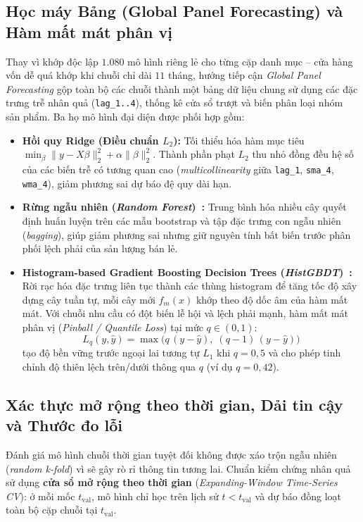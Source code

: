 \subsection{Học máy Bảng (Global Panel Forecasting) và Hàm mất mát phân vị}
Thay vì khớp độc lập $1.080$ mô hình riêng lẻ cho từng cặp danh mục -- cửa hàng vốn dễ quá khớp khi chuỗi chỉ dài $11$ tháng, hướng tiếp cận \textit{Global Panel Forecasting} gộp toàn bộ các chuỗi thành một bảng dữ liệu chung sử dụng các đặc trưng trễ nhân quả (\texttt{lag_1..4}), thống kê cửa sổ trượt và biến phân loại nhóm sản phẩm. Ba họ mô hình đại diện được phối hợp gồm:
\begin{itemize}[topsep=0pt, itemsep=1pt]
	\item \textbf{Hồi quy Ridge (Điều chuẩn $L_2$):} Tối thiểu hóa hàm mục tiêu $\min_{\beta} \|y - X\beta\|_2^2 + \alpha \|\beta\|_2^2$. Thành phần phạt $L_2$ thu nhỏ đồng đều hệ số của các biến trễ có tương quan cao (\textit{multicollinearity} giữa \texttt{lag_1}, \texttt{sma_4}, \texttt{wma_4}), giảm phương sai dự báo đệ quy dài hạn.
	\item \textbf{Rừng ngẫu nhiên (\textit{Random Forest})~\cite{breiman2001rf}:} Trung bình hóa nhiều cây quyết định huấn luyện trên các mẫu bootstrap và tập đặc trưng con ngẫu nhiên (\textit{bagging}), giúp giảm phương sai nhưng giữ nguyên tính bất biến trước phân phối lệch phải của sản lượng bán lẻ.
	\item \textbf{Histogram-based Gradient Boosting Decision Trees (\textit{HistGBDT})~\cite{friedman2001gbm}:} Rời rạc hóa đặc trưng liên tục thành các thùng histogram để tăng tốc độ xây dựng cây tuần tự, mỗi cây mới $f_m(x)$ khớp theo độ dốc âm của hàm mất mát. Với chuỗi nhu cầu có đột biến lễ hội và lệch phải mạnh, hàm mất mát phân vị (\textit{Pinball / Quantile Loss}) tại mức $q \in (0, 1)$:
	      \begin{equation}
		      L_q(y, \hat{y}) = \max\bigl(q\,(y - \hat{y}),\; (q - 1)\,(y - \hat{y})\bigr)
	      \end{equation}
	      tạo độ bền vững trước ngoại lai tương tự $L_1$ khi $q=0{,}5$ và cho phép tinh chỉnh độ thiên lệch trên/dưới thông qua $q$ (ví dụ $q=0{,}42$).
\end{itemize}

\subsection{Xác thực mở rộng theo thời gian, Dải tin cậy và Thước đo lỗi}
Đánh giá mô hình chuỗi thời gian tuyệt đối không được xáo trộn ngẫu nhiên (\textit{random k-fold}) vì sẽ gây rò rỉ thông tin tương lai. Chuẩn kiểm chứng nhân quả sử dụng \textbf{cửa sổ mở rộng theo thời gian} (\textit{Expanding-Window Time-Series CV}): ở mỗi mốc $t_{\text{val}}$, mô hình chỉ học trên lịch sử $t < t_{\text{val}}$ và dự báo đồng loạt toàn bộ cặp chuỗi tại $t_{\text{val}}$.

